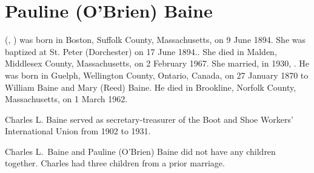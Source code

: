 \section{Pauline (O'Brien) Baine}

 (, ) was born in Boston, Suffolk County, Massachusetts, on 9 June 1894.\cite{Pauline4OBrienBirth} She was baptized at St. Peter (Dorchester) on 17 June 1894.\cite{Pauline4OBrienBaptism}. She died in Malden, Middlesex County, Massachusetts, on 2 February 1967.\cite{Pauline4OBrienDeath} She married, in 1930, .\cite{CharlesBaineMarriage} He was born in Guelph, Wellington County, Ontario, Canada, on 27 January 1870\cite{CharlesBainePassport} to William Baine and Mary (Reed) Baine.\cite{Census1880CharlesBaine,CharlesBaineBaptism} He died in Brookline, Norfolk County, Massachusetts, on 1 March 1962.\cite{CharlesBaineDeath}

Charles L. Baine served as secretary-treasurer of the Boot and Shoe Workers' International Union from 1902 to 1931.\cite{Gompers}

Charles L.\ Baine and Pauline (O'Brien) Baine did not have any children together.\cite{Pauline4OBrienDeath2} Charles had three children from a prior marriage.\cite{CharlesBaineDeath}